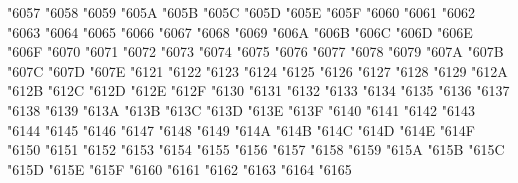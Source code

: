{\Uchar\jis"6057 %
\Uchar\jis"6058 %
\Uchar\jis"6059 %
\Uchar\jis"605A %
\Uchar\jis"605B %
\Uchar\jis"605C %
\Uchar\jis"605D %
\Uchar\jis"605E %
\Uchar\jis"605F %
\Uchar\jis"6060 %
\Uchar\jis"6061 %
\Uchar\jis"6062 %
\Uchar\jis"6063 %
\Uchar\jis"6064 %
\Uchar\jis"6065 %
\Uchar\jis"6066 %
\Uchar\jis"6067 %
\Uchar\jis"6068 %
\Uchar\jis"6069 %
\Uchar\jis"606A %
\Uchar\jis"606B %
\Uchar\jis"606C %
\Uchar\jis"606D %
\Uchar\jis"606E %
\Uchar\jis"606F %
\Uchar\jis"6070 %
\Uchar\jis"6071 %
\Uchar\jis"6072 %
\Uchar\jis"6073 %
\Uchar\jis"6074 %
\Uchar\jis"6075 %
\Uchar\jis"6076 %
\Uchar\jis"6077 %
\Uchar\jis"6078 %
\Uchar\jis"6079 %
\Uchar\jis"607A %
\Uchar\jis"607B %
\Uchar\jis"607C %
\Uchar\jis"607D %
\Uchar\jis"607E %
\Uchar\jis"6121 %
\Uchar\jis"6122 %
\Uchar\jis"6123 %
\Uchar\jis"6124 %
\Uchar\jis"6125 %
\Uchar\jis"6126 %
\Uchar\jis"6127 %
\Uchar\jis"6128 %
\Uchar\jis"6129 %
\Uchar\jis"612A %
\Uchar\jis"612B %
\Uchar\jis"612C %
\Uchar\jis"612D %
\Uchar\jis"612E %
\Uchar\jis"612F %
\Uchar\jis"6130 %
\Uchar\jis"6131 %
\Uchar\jis"6132 %
\Uchar\jis"6133 %
\Uchar\jis"6134 %
\Uchar\jis"6135 %
\Uchar\jis"6136 %
\Uchar\jis"6137 %
\Uchar\jis"6138 %
\Uchar\jis"6139 %
\Uchar\jis"613A %
\Uchar\jis"613B %
\Uchar\jis"613C %
\Uchar\jis"613D %
\Uchar\jis"613E %
\Uchar\jis"613F %
\Uchar\jis"6140 %
\Uchar\jis"6141 %
\Uchar\jis"6142 %
\Uchar\jis"6143 %
\Uchar\jis"6144 %
\Uchar\jis"6145 %
\Uchar\jis"6146 %
\Uchar\jis"6147 %
\Uchar\jis"6148 %
\Uchar\jis"6149 %
\Uchar\jis"614A %
\Uchar\jis"614B %
\Uchar\jis"614C %
\Uchar\jis"614D %
\Uchar\jis"614E %
\Uchar\jis"614F %
\Uchar\jis"6150 %
\Uchar\jis"6151 %
\Uchar\jis"6152 %
\Uchar\jis"6153 %
\Uchar\jis"6154 %
\Uchar\jis"6155 %
\Uchar\jis"6156 %
\Uchar\jis"6157 %
\Uchar\jis"6158 %
\Uchar\jis"6159 %
\Uchar\jis"615A %
\Uchar\jis"615B %
\Uchar\jis"615C %
\Uchar\jis"615D %
\Uchar\jis"615E %
\Uchar\jis"615F %
\Uchar\jis"6160 %
\Uchar\jis"6161 %
\Uchar\jis"6162 %
\Uchar\jis"6163 %
\Uchar\jis"6164 %
\Uchar\jis"6165 %
}
